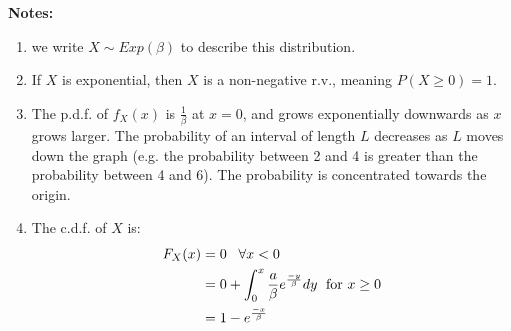 \documentclass[12pt]{article}
\begin{document}
\textbf{Notes:}
\begin{enumerate}
    \item we write $X \sim Exp(\beta)$ to describe this distribution.
    \item If $X$ is exponential, then $X$ is a non-negative r.v., meaning $P(X \geq 0) = 1$.
    \item The p.d.f. of $f_X (x)$ is $\frac{1}{\beta}$ at $x=0$, and grows exponentially downwards as $x$ grows larger. The probability of an interval of length $L$ decreases as $L$ moves down the graph (e.g. the probability between 2 and 4 is greater than the probability between 4 and 6). The probability is concentrated towards the origin.
    \item The c.d.f. of $X$ is:
        \begin{align*}
            F_X (x) &= 0 \; \; \; \forall x < 0 \\
                &= 0 + \int_0^x \frac{a}{\beta} e^{\frac{-y}{\beta}} dy \; \textnormal{ for } x \geq 0 \\
                &= 1 - e^{\frac{-x}{\beta}}
        \end{align*}


\end{enumerate}
\end{document}
